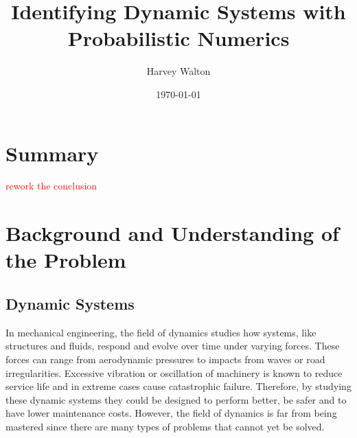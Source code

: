 \documentclass[12pt]{article}
\title{Identifying Dynamic Systems with Probabilistic Numerics}
\author{Harvey Walton}
\date{\today}
\begin{document}

    \thispagestyle{empty}
    

    \section{Summary}
    \textcolor{red}{rework the conclusion}

    \printnomenclature

    \newpage
    \tableofcontents
    \newpage


    \section{Background and Understanding of the Problem}

    \subsection{Dynamic Systems}
    In mechanical engineering, the field of dynamics studies how systems, like structures and fluids, respond and evolve over time under varying forces.
    These forces can range from aerodynamic pressures to impacts from waves or road irregularities.
    Excessive vibration or oscillation of machinery is known to reduce service life and in extreme cases cause catastrophic failure.
    Therefore, by studying these dynamic systems they could be designed to perform better, be safer and to have lower maintenance costs.
    However, the field of dynamics is far from being mastered since there are many types of problems that cannot yet be solved.
\end{document}

